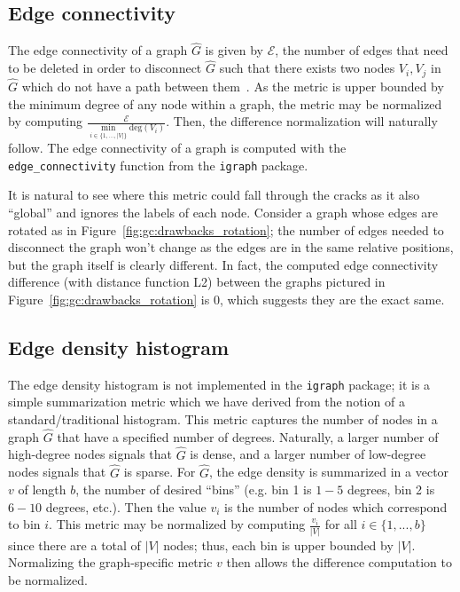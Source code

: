 \subsection{Edge connectivity}

The edge connectivity of a graph $\hat{G}$ is given by $\mathcal{E}$, the 
number of edges that need to be deleted in order to disconnect 
$\hat{G}$ such that there exists two nodes $V_i,V_j$ in $\hat{G}$ which do not 
have a path between them~\cite{igraph}.
As the metric is upper bounded by the minimum 
degree of any node within a graph, the metric may be normalized by computing 
$\frac{\mathcal{E}}{\min\limits_{i \in \{1,...,|V|\}} \text{deg}(V_i)}$. Then, 
the difference normalization will naturally follow.
The edge connectivity of a graph is computed 
with the \texttt{edge\_connectivity} function from the \texttt{igraph} package. 

It is natural to see where this metric could fall through the cracks as it also 
``global'' and ignores the labels of each node. Consider 
a graph whose edges are rotated as in Figure~\ref{fig:gc:drawbacks_rotation}; 
the number of edges needed to disconnect the graph won't change as the edges 
are in the same relative positions, but the graph itself is clearly different. 
In fact, the computed edge connectivity difference (with distance function L2) 
between the graphs pictured in Figure~\ref{fig:gc:drawbacks_rotation} is 0, 
which suggests they are the exact same.

\subsection{Edge density histogram}

The edge density histogram is not implemented in the \texttt{igraph} package; 
it is a simple summarization metric which we have derived from the notion of a 
standard/traditional histogram. 
This metric captures the number of nodes in a graph $\hat{G}$ that have a 
specified number of degrees. Naturally, a larger number of high-degree nodes 
signals that $\hat{G}$ is dense, and a larger number of low-degree nodes 
signals that $\hat{G}$ is sparse. For 
$\hat{G}$, the edge density is summarized in a 
vector $v$ of length $b$, the number of desired ``bins'' 
(e.g. bin 1 is $1-5$ degrees, bin 2 is $6-10$ degrees, etc.). Then the value 
$v_i$ is the number of nodes which correspond to bin $i$. This 
metric may be normalized by computing $\frac{v_i}{|V|}$ for 
all $i \in \{1,...,b\}$ since there are a total of $|V|$ nodes; thus, each bin 
is upper bounded by $|V|$. Normalizing the graph-specific metric $v$ then
allows the difference computation to be normalized. 

